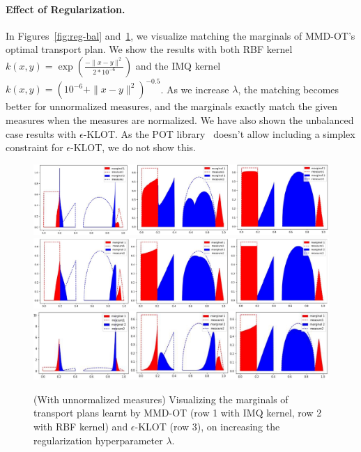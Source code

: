 \paragraph{Effect of Regularization.} In Figures~\ref{fig:reg-bal} and~\ref{fig:reg-unb}, we visualize matching the marginals of MMD-OT's optimal transport plan. We show the results with both RBF kernel $k(x, y) = \exp{\left(\frac{-\|x-y\|^2}{2*10^{-6}}\right)}$ and the IMQ kernel $k(x, y) = \left(10^{-6}+\|x-y\|^2\right)^{-0.5}$. As we increase $\lambda$, the matching becomes better for unnormalized measures, and the marginals exactly match the given measures when the measures are normalized. We have also shown the unbalanced case results with $\epsilon$-KLOT. As the POT library~\citep{flamary2021pot} doesn't allow including a simplex constraint for $\epsilon$-KLOT, we do not show this.
\begin{figure}[t]
    \centering
\includegraphics[width=\linewidth]{chapter-1/images/unb-IMQ.pdf}\\
\includegraphics[width=\linewidth]{chapter-1/images/unb-RBF.pdf}\\
\includegraphics[width=\linewidth]{chapter-1/images/unb-KL.pdf}
    \caption{(With unnormalized measures) Visualizing the marginals of transport plans learnt by MMD-OT (row 1 with IMQ kernel, row 2 with RBF kernel) and $\epsilon$-KLOT (row 3), on increasing the regularization hyperparameter $\lambda$.}
    \label{fig:reg-unb}
\end{figure}

